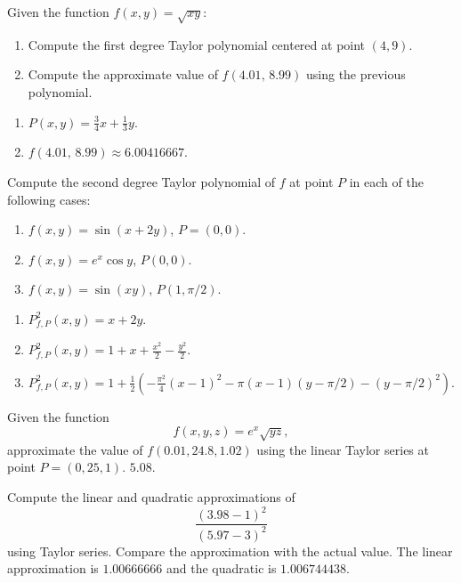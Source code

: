 
{Given the function $f(x,y)=\sqrt{xy}$:
\begin{enumerate}
\item Compute the first degree Taylor polynomial centered at point $(4,9)$.
\item Compute the approximate value of $f(4.01,\,8.99)$ using the previous polynomial.
\end{enumerate}
}
{\begin{enumerate}
\item $P(x,y)= \frac{3}{4}x+\frac{1}{3}y$.
\item $f(4.01,\,8.99)\approx 6.00416667$.
\end{enumerate}
}
{
}


{Compute the second degree Taylor polynomial of $f$ at point $P$ in each of the following cases:
\begin{enumerate}
\item $f(x,y)=\sin(x+2y)$, $P=(0,0)$.
\item $f(x,y)=e^x\cos y$, $P(0,0)$.
\item $f(x,y)=\sin(xy)$, $P(1,\pi/2)$.
\end{enumerate}
}
{\begin{enumerate}
\item $P^2_{f,P}(x,y)= x+2y$.
\item $P^2_{f,P}(x,y)= 1+x+\frac{x^2}{2}-\frac{y^2}{2}$.
\item $P^2_{f,P}(x,y)= 1+\frac{1}{2}\left(-\frac{\pi^2}{4}(x-1)^2-\pi(x-1)(y-\pi/2)-(y-\pi/2)^2\right)$.
\end{enumerate}
}
{
}


{Given the function
\[
f(x,y,z)=e^x\sqrt{yz},
\]
approximate the value of $f(0.01,24.8,1.02)$ using the linear Taylor series at point $P=(0,25,1)$.
}
{$5.08$.
}
{
}


{Compute the linear and quadratic approximations of
\[
\frac{(3.98-1)^2}{(5.97-3)^2}
\]
using Taylor series.
Compare the approximation with the actual value.
}
{The linear approximation is $1.00666666$ and the quadratic is $1.006744438$.
}
{
}
